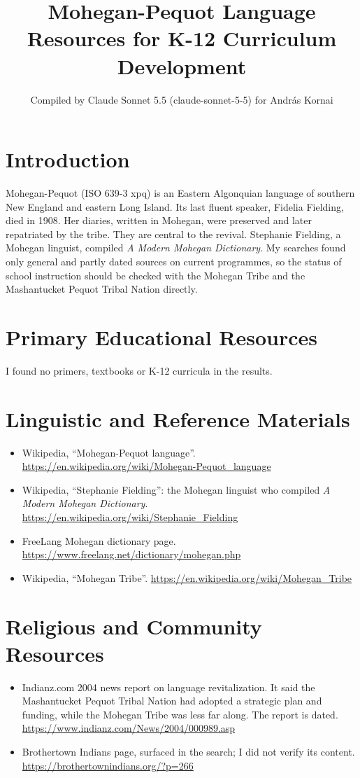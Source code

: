 \documentclass[12pt]{article}
\title{Mohegan-Pequot Language Resources for K-12 Curriculum Development}
\author{Compiled by Claude Sonnet 5.5 (claude-sonnet-5-5) for Andr\'as Kornai}
\date{}
\begin{document}
\maketitle

\section{Introduction}
Mohegan-Pequot (ISO 639-3 xpq) is an Eastern Algonquian language of southern New England and eastern Long Island. Its last fluent speaker, Fidelia Fielding, died in 1908. Her diaries, written in Mohegan, were preserved and later repatriated by the tribe. They are central to the revival. Stephanie Fielding, a Mohegan linguist, compiled \emph{A Modern Mohegan Dictionary}. My searches found only general and partly dated sources on current programmes, so the status of school instruction should be checked with the Mohegan Tribe and the Mashantucket Pequot Tribal Nation directly.

\section{Primary Educational Resources}
I found no primers, textbooks or K-12 curricula in the results.

\section{Linguistic and Reference Materials}
\begin{itemize}
\item Wikipedia, ``Mohegan-Pequot language''. \url{https://en.wikipedia.org/wiki/Mohegan-Pequot_language}
\item Wikipedia, ``Stephanie Fielding'': the Mohegan linguist who compiled \emph{A Modern Mohegan Dictionary}. \url{https://en.wikipedia.org/wiki/Stephanie_Fielding}
\item FreeLang Mohegan dictionary page. \url{https://www.freelang.net/dictionary/mohegan.php}
\item Wikipedia, ``Mohegan Tribe''. \url{https://en.wikipedia.org/wiki/Mohegan_Tribe}
\end{itemize}

\section{Religious and Community Resources}
\begin{itemize}
\item Indianz.com 2004 news report on language revitalization. It said the Mashantucket Pequot Tribal Nation had adopted a strategic plan and funding, while the Mohegan Tribe was less far along. The report is dated. \url{https://www.indianz.com/News/2004/000989.asp}
\item Brothertown Indians page, surfaced in the search; I did not verify its content. \url{https://brothertownindians.org/?p=266}
\end{itemize}
\end{document}
